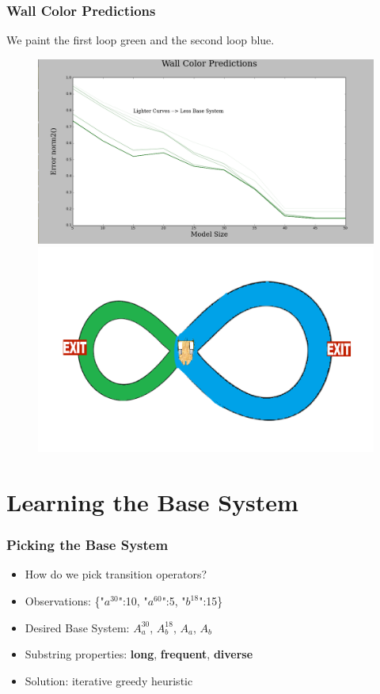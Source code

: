 \documentclass{beamer}
\begin{document}

\begin{frame}
\frametitle{Wall Color Predictions}
We paint the first loop green and the second loop blue.
\begin{figure}
\includegraphics[width=0.5\linewidth]{lucasplots/monImages/WallColorPredictions.png}
\includegraphics[width=0.5\linewidth]{lucasplots/monImages/doubleLoopImageMO.png}

\end{figure}
\end{frame}



\section{Learning the Base System}

\begin{frame}
\frametitle{Picking the Base System}
\begin{itemize}


\item How do we pick transition operators?
\item[] Observations: \{"$a^{30}$":10, "$a^{60}$":5, "$b^{18}$":15\}

\item[] Desired Base System: {$A_a^{30}$, $A_b^{18}$, $A_a$, $A_b$}

\item Substring properties: 
\textbf{long}, \textbf{frequent}, \textbf{diverse}

\item Solution: iterative greedy heuristic 


\end{itemize}
\end{frame}
\end{document}
